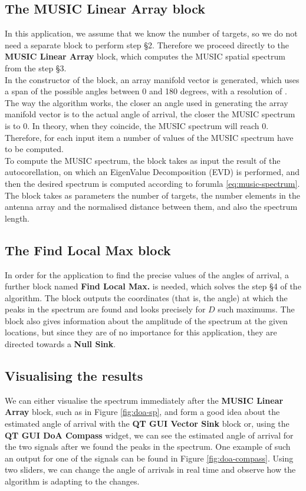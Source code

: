 \subsection{The MUSIC Linear Array block}
In this application, we assume that we know the number of targets, so we do not
need a separate block to perform step \S2. Therefore we proceed directly to the
\textbf{MUSIC Linear Array} block, which computes the MUSIC spatial spectrum
from the step \S3. \\

In the constructor of the block, an array manifold vector is generated, which
uses a span of the possible angles between 0 and 180 degrees, with a resolution
of . The way the algorithm works, the closer an angle used
in generating the array manifold vector is to the actual angle of arrival, the
closer the MUSIC spectrum is to 0. In theory, when they coincide, the MUSIC
spectrum will reach 0. Therefore, for each input item a number of
 values of the MUSIC spectrum have to be computed. \\

To compute the MUSIC spectrum, the block takes as input the result of the
autocorellation, on which an EigenValue Decomposition (EVD) is performed, and
then the desired spectrum is computed according to forumla
\eqref{eq:music-spectrum}. The block takes as parameters the number of targets,
the number elements in the antenna array and the normalised distance between
them, and also the spectrum length. \\


\subsection{The Find Local Max block}
In order for the application to find the precise values of the angles of
arrival, a further block named \textbf{Find Local Max.} is needed, which solves
the step \S4 of the algorithm. The block outputs the coordinates (that is, the
angle) at which the peaks in the spectrum are found and looks precisely for $D$
such maximums. The block also gives information about the amplitude of the
spectrum at the given locations, but since they are of no importance for this
application, they are directed towards a \textbf{Null Sink}.

\subsection{Visualising the results}
We can either visualise the spectrum immediately after the \textbf{MUSIC Linear
Array} block, such as in Figure \ref{fig:doa-sp}, and form a good idea about the
estimated angle of arrival with the \textbf{QT GUI Vector Sink} block or, using
the \textbf{QT GUI DoA Compass} widget, we can see the estimated angle of
arrival for the two signals after we found the peaks in the spectrum. One
example of such an output for one of the signals can be found in Figure
\ref{fig:doa-compass}. Using two sliders, we can change the angle of arrivals in
real time and observe how the algorithm is adapting to the changes.

